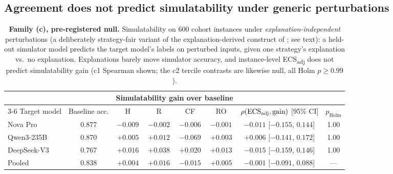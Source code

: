 \documentclass[11pt]{article}
\newcommand{\ecsadj}{\mbox{ECS\textsubscript{adj}}}
\begin{document}
\subsection{Agreement does not predict simulatability under generic perturbations}
\label{sec:simulatability}

\begin{table}[t]
\centering
\small
\begin{tabular}{lccccccc}
\toprule
& & \multicolumn{4}{c}{Simulatability gain over baseline} & & \\
\cmidrule(lr){3-6}
Target model & Baseline acc. & H & R & CF & RO & $\rho(\ecsadj,\text{gain})$ [95\% CI] & $p_{\mathrm{Holm}}$ \\
\midrule
Nova Pro    & 0.877 & $-0.009$ & $-0.002$ & $-0.006$ & $-0.001$ & $-0.011$ [$-0.155$, $0.144$] & 1.00 \\
Qwen3-235B  & 0.870 & $+0.005$ & $+0.012$ & $-0.069$ & $+0.003$ & $+0.006$ [$-0.141$, $0.172$] & 1.00 \\
DeepSeek-V3 & 0.767 & $+0.016$ & $+0.038$ & $+0.020$ & $+0.013$ & $-0.015$ [$-0.159$, $0.146$] & 1.00 \\
\midrule
Pooled      & 0.838 & $+0.004$ & $+0.016$ & $-0.015$ & $+0.005$ & $-0.001$ [$-0.091$, $0.088$] & --- \\
\bottomrule
\end{tabular}
\caption{\textbf{Family (c), pre-registered null.} Simulatability on 600 cohort instances under \emph{explanation-independent} perturbations (a deliberately strategy-fair variant of the explanation-derived construct of \citealp{chen2024models}; see text): a held-out simulator model predicts the target model's labels on perturbed inputs, given one strategy's explanation vs.\ no explanation. Explanations barely move simulator accuracy, and instance-level \ecsadj{} does not predict simulatability gain (c1 Spearman shown; the c2 tercile contrasts are likewise null, all Holm $p\ge0.99$).}
\label{tab:simulatability}
\end{table}
\end{document}

